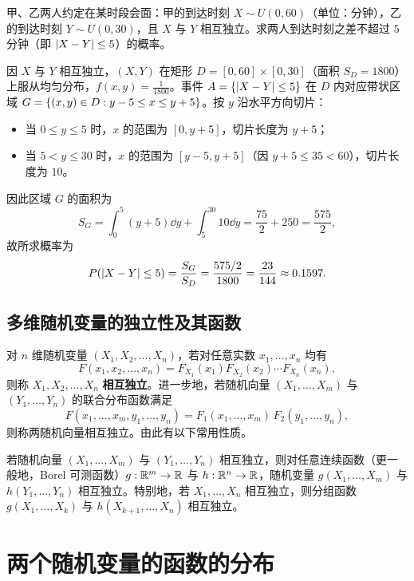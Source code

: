 \begin{example}[title={独立随机到达时刻的相遇概率}]
\label{eg:arrival-strip}
甲、乙两人约定在某时段会面：甲的到达时刻 $X\sim U(0,60)$（单位：分钟），乙的到达时刻 $Y\sim U(0,30)$，且 $X$ 与 $Y$ 相互独立。求两人到达时刻之差不超过 $5$ 分钟（即 $\lvert X-Y\rvert\le 5$）的概率。
\begin{solution}
因 $X$ 与 $Y$ 相互独立，$(X,Y)$ 在矩形 $D=[0,60]\times[0,30]$（面积 $S_D=1800$）上服从均匀分布，$f(x,y)=\frac{1}{1800}$。事件 $A=\{\lvert X-Y\rvert\le 5\}$ 在 $D$ 内对应带状区域 $G=\{(x,y)\in D: y-5\le x\le y+5\}$。按 $y$ 沿水平方向切片：
\begin{itemize}
  \item 当 $0\le y\le 5$ 时，$x$ 的范围为 $[0,y+5]$，切片长度为 $y+5$；
  \item 当 $5<y\le 30$ 时，$x$ 的范围为 $[y-5,y+5]$（因 $y+5\le 35<60$），切片长度为 $10$。
\end{itemize}
因此区域 $G$ 的面积为
\[
  S_G=\int_{0}^{5}(y+5)\dd y+\int_{5}^{30}10\dd y=\frac{75}{2}+250=\frac{575}{2},
\]
故所求概率为
\[
  P(\lvert X-Y\rvert\le 5)=\frac{S_G}{S_D}=\frac{575/2}{1800}=\frac{23}{144}\approx 0.1597.
\]
\end{solution}
\end{example}

\subsection{多维随机变量的独立性及其函数}

对 $n$ 维随机变量 $(X_1,X_2,\ldots,X_n)$，若对任意实数 $x_1,\ldots,x_n$ 均有
\[
  F(x_1,x_2,\ldots,x_n)=F_{X_1}(x_1)F_{X_2}(x_2)\cdots F_{X_n}(x_n),
\]
则称 $X_1,X_2,\ldots,X_n$ \textbf{相互独立}。进一步地，若随机向量 $(X_1,\ldots,X_m)$ 与 $(Y_1,\ldots,Y_n)$ 的联合分布函数满足
\[
  F(x_1,\ldots,x_m,y_1,\ldots,y_n)=F_1(x_1,\ldots,x_m)\,F_2(y_1,\ldots,y_n),
\]
则称两随机向量相互独立。由此有以下常用性质。

\begin{theorem}[独立随机变量的函数仍相互独立]
\label{thm:indep-functions}
若随机向量 $(X_1,\ldots,X_m)$ 与 $(Y_1,\ldots,Y_n)$ 相互独立，则对任意连续函数（更一般地，Borel 可测函数）$g:\mathbb{R}^m\to\mathbb{R}$ 与 $h:\mathbb{R}^n\to\mathbb{R}$，随机变量 $g(X_1,\ldots,X_m)$ 与 $h(Y_1,\ldots,Y_n)$ 相互独立。特别地，若 $X_1,\ldots,X_n$ 相互独立，则分组函数 $g(X_1,\ldots,X_k)$ 与 $h(X_{k+1},\ldots,X_n)$ 相互独立。
\end{theorem}

\section{两个随机变量的函数的分布}
\label{sec:bivariate-transform}

